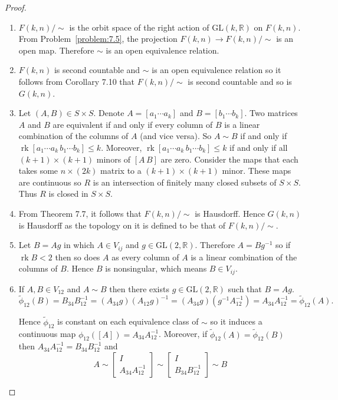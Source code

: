 \begin{proof}
	\begin{enumerate}[label={(\alph*)},leftmargin=*]
		\item \( F(k,n)/\!\sim \) is the orbit space of the right action of \( \mathrm{GL}(k, \mathbb{R}) \) on \( F(k, n) \). From Problem~\ref{problem:7.5}, the projection \( F(k,n) \to F(k,n)/\!\sim \) is an open map. Therefore \( \sim \) is an open equivalence relation.
		\item \( F(k, n) \) is second countable and \( \sim \) is an open equivalence relation so it follows from Corollary 7.10 that \( F(k, n)/\!\sim \) is second countable and so is \( G(k, n) \).
		\item Let \( (A, B) \in S \times S \). Denote \( A = [a_{1} \cdots a_{k}] \) and \( B = [b_{1} \cdots b_{k}] \). Two matrices \( A \) and \( B \) are equivalent if and only if every column of \( B \) is a linear combination of the columns of \( A \) (and vice versa). So \( A \sim B \) if and only if \( \operatorname{rk}[a_{1} \cdots a_{k}\, b_{1} \cdots b_{k}] \leq k \). Moreover, \( \operatorname{rk}[a_{1} \cdots a_{k}\, b_{1} \cdots b_{k}] \leq k \) if and only if all \( (k+1)\times (k+1) \) minors of \( [A\, B] \) are zero. Consider the maps that each takes some \( n\times (2k) \) matrix to a \( (k + 1)\times (k+1) \) minor. These maps are continuous so \( R \) is an intersection of finitely many closed subsets of \( S\times S \). Thus \( R \) is closed in \( S\times S \).
		\item From Theorem 7.7, it follows that \( F(k,n)/\!\sim \) is Hausdorff. Hence \( G(k, n) \) is Hausdorff as the topology on it is defined to be that of \( F(k, n)/\!\sim \).
		\item Let \( B = Ag \) in which \( A \in V_{ij} \) and \( g \in \mathrm{GL}(2, \mathbb{R}) \). Therefore \( A = Bg^{-1} \) so if \( \operatorname{rk}B < 2 \) then so does \(A\) as every column of \(A\) is a linear combination of the columns of \(B\). Hence \( B \) is nonsingular, which means \( B \in V_{ij} \).
		\item If \( A, B \in V_{12} \) and \( A \sim B \) then there exists \( g \in \mathrm{GL}(2, \mathbb{R}) \) such that \( B = Ag \).
		      \[
			      \tilde{\phi}_{12}(B) = B_{34}B_{12}^{-1} = (A_{34}g){(A_{12}g)}^{-1} = (A_{34}g)(g^{-1}A_{12}^{-1}) = A_{34}A_{12}^{-1} = \tilde{\phi}_{12}(A).
		      \]

		      Hence \( \tilde{\phi}_{12} \) is constant on each equivalence class of \( \sim \) so it induces a continuous map \( \phi_{12}([A]) = A_{34}A_{12}^{-1} \). Moreover, if \( \tilde{\phi}_{12}(A) = \tilde{\phi}_{12}(B) \) then \( A_{34}A_{12}^{-1} = B_{34}B_{12}^{-1} \) and
		      \[ A \sim \begin{bmatrix}I \\ A_{34}A_{12}^{-1} \end{bmatrix} \sim \begin{bmatrix}I \\ B_{34}B_{12}^{-1} \end{bmatrix} \sim B \]


\end{enumerate}
\end{proof}
